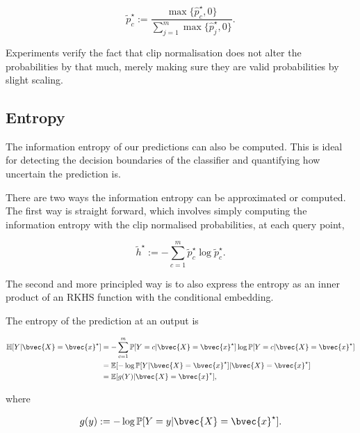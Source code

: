 \documentclass[a4paper, 12pt]{article}
\begin{document}
	\begin{equation}
		\tilde{p}^{\star}_{c} := \frac{\max\{\hat{p}^{\star}_{c}, 0\}}{\sum_{j = 1}^{m} \max\{\hat{p}^{\star}_{j}, 0\}}.
	\end{equation}
	
	Experiments verify the fact that clip normalisation does not alter the probabilities by that much, merely making sure they are valid probabilities by slight scaling.
	
	\subsection{Entropy}
	
		The information entropy of our predictions can also be computed. This is ideal for detecting the decision boundaries of the classifier and quantifying how uncertain the prediction is.
		
		There are two ways the information entropy can be approximated or computed. The first way is straight forward, which involves simply computing the information entropy with the clip normalised probabilities, at each query point,
		
		\begin{equation}
			\tilde{h}^{\star} := - \sum_{c = 1}^{m} \tilde{p}^{\star}_{c} \log{\tilde{p}^{\star}_{c}}.
		\end{equation}
		
		The second and more principled way is to also express the entropy as an inner product of an RKHS function with the conditional embedding.
		
		The entropy of the prediction at an output is
		
		\begin{equation}
			\begin{aligned}
				\mathbb{H}[Y | \bvec{X} = \bvec{x}^{\star}] &= - \sum_{c = 1}^{m} \mathbb{P}[Y = c| \bvec{X} = \bvec{x}^{\star}] \log{\mathbb{P}[Y = c | \bvec{X} = \bvec{x}^{\star}]} \\
				&= \mathbb{E}[- \log{\mathbb{P}[Y | \bvec{X} = \bvec{x}^{\star}]} | \bvec{X} = \bvec{x}^{\star}] \\
				&= \mathbb{E}[g(Y) | \bvec{X} = \bvec{x}^{\star}],
			\end{aligned}
		\end{equation}
		
		where 
		
		\begin{equation}
			g(y) := - \log{\mathbb{P}[Y = y | \bvec{X} = \bvec{x}^{\star}]}.
		\end{equation}
		
\end{document}
